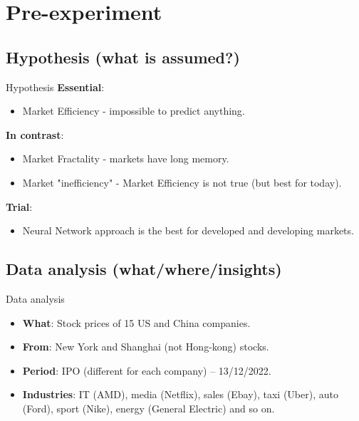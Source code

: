 \documentclass[11pt, aspectratio= 169]{beamer}
\begin{document}
	\section{Pre-experiment}
	\subsection{Hypothesis (what is assumed?)}
	\begin{frame}{Hypothesis}
		\Large
		\textbf{Essential}:
		\begin{itemize}
			\item Market Efficiency \cite{fama1970efficient} - impossible to predict anything.
		\end{itemize}
		
		\textbf{In contrast}:
		\begin{itemize}
			\item Market Fractality \cite{mandelbrot2006misbehavior} - markets have long memory.
			\item Market "inefficiency" \cite{matrin2011history} - Market Efficiency is not true (but best for today).
		\end{itemize}
	
		\textbf{Trial}:
		\begin{itemize}
			\item Neural Network approach is the best for developed and developing markets. 
		\end{itemize}
	\end{frame}
	
	\subsection{Data analysis (what/where/insights)}
	\begin{frame}{Data analysis}
		\Large
		\begin{itemize}
			\item[] \textbf{What}: Stock prices of 15 US and China companies.
			\item[] \textbf{From}: New York and Shanghai (not Hong-kong) stocks.
			\item[] \textbf{Period}: IPO (different for each company) -- 13/12/2022.
			\item[] \textbf{Industries}: IT (AMD), media (Netflix), sales (Ebay), taxi (Uber), auto (Ford), sport (Nike), energy (General Electric) and so on.
		\end{itemize}
	\end{frame}
\end{document}
